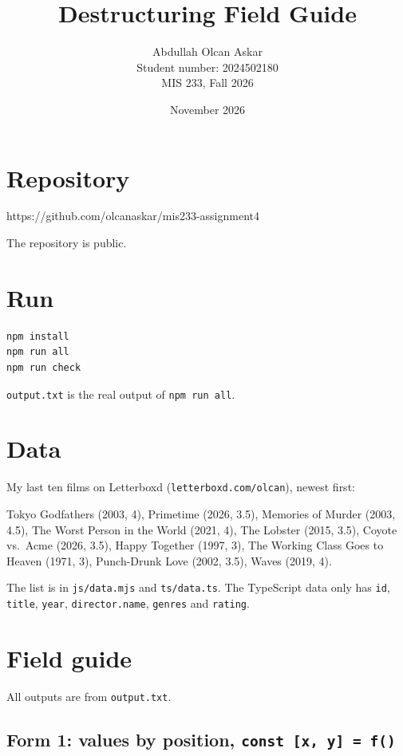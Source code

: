 \documentclass[
  11pt,
]{article}
\title{Destructuring Field Guide}
\author{Abdullah Olcan Askar\\Student number: 2024502180\\MIS 233, Fall 2026}
\date{November 2026}
\begin{document}
\raggedright
\raggedright
\maketitle
\thispagestyle{empty}
\newpage

{
\setcounter{tocdepth}{3}
\tableofcontents
}
\newpage

\section{Repository}\label{repository}

https://github.com/olcanaskar/mis233-assignment4

The repository is public.

\section{Run}\label{run}

\begin{lstlisting}
npm install
npm run all
npm run check
\end{lstlisting}

\texttt{output.txt} is the real output of
\texttt{npm run all}.

\section{Data}\label{data}

My last ten films on Letterboxd
(\texttt{letterboxd.com/olcan}), newest first:

Tokyo Godfathers (2003, 4), Primetime (2026, 3.5), Memories of Murder
(2003, 4.5), The Worst Person in the World (2021, 4), The Lobster (2015,
3.5), Coyote vs.~Acme (2026, 3.5), Happy Together (1997, 3), The Working
Class Goes to Heaven (1971, 3), Punch-Drunk Love (2002, 3.5), Waves
(2019, 4).

The list is in \texttt{js/data.mjs} and
\texttt{ts/data.ts}. The TypeScript data only has
\texttt{id}, \texttt{title},
\texttt{year}, \texttt{director.name},
\texttt{genres} and \texttt{rating}.

\section{Field guide}\label{field-guide}

All outputs are from \texttt{output.txt}.

\subsection{\texorpdfstring{Form 1: values by position,
\texttt{const\ {[}x,\ y{]}\ =\ f()}}{Form 1: values by position, const {[}x, y{]} = f()}}\label{form-1-values-by-position-const-x-y-f}
\end{document}
